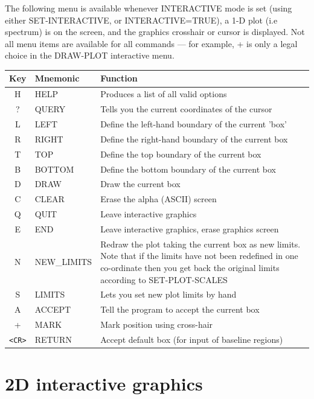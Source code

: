 \documentclass[11pt,twoside]{report}
\begin{document}
The following menu is available whenever INTERACTIVE mode is set (using
either SET-INTERACTIVE, or INTERACTIVE=TRUE), a 1-D plot (i.e spectrum)
is on the screen, and the graphics crosshair
or cursor is displayed. Not all menu items are available for all commands ---
for example, + is only a legal choice in the DRAW-PLOT interactive menu.

\begin{table}[htbp]
\begin{center}
\begin{tabular}{|c|l|l|} \hline
Key	& Mnemonic	& Function \\ \hline
H       &HELP	&Produces a list of all valid options\\
?	&QUERY	&Tells you the current coordinates of the cursor\\
L	&LEFT	&Define the left-hand boundary of the current 'box'\\
R	&RIGHT	&Define the right-hand boundary of the current box\\
T	&TOP	&Define the top boundary of the current box\\
B	&BOTTOM	&Define the bottom boundary of the current box\\
D	&DRAW	&Draw the current box\\
C	&CLEAR	&Erase the alpha (ASCII) screen\\
Q	&QUIT	&Leave interactive graphics\\
E	&END	&Leave interactive graphics, erase graphics screen\\
N	&NEW\_LIMITS    &
    \parbox[t]{3.7in}{Redraw the plot taking the current box as new
            limits. Note that if the limits have not been
            redefined in one co-ordinate then you get back the
            original limits according to SET-PLOT-SCALES}\\
S	&LIMITS	&Lets you set new plot limits by hand\\
A	&ACCEPT	&Tell the program to accept the current box\\
+	&MARK	&Mark position using cross-hair\\
\verb+<CR>+ &RETURN &Accept default box (for input of baseline regions)\\ \hline
\end{tabular}
\end{center}
\end{table}

\newpage
\section{2D interactive graphics}
\end{document}
